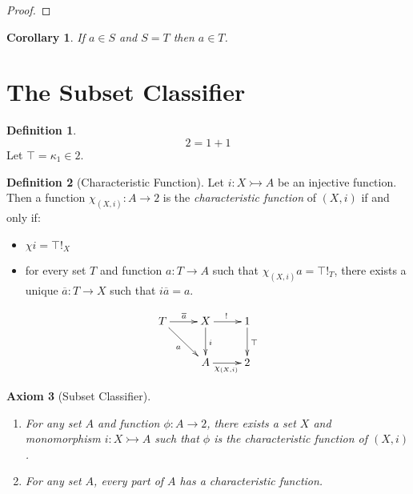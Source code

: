 \documentclass{book}
\let\qed\relax
\newtheorem{ax}{Axiom}[chapter]
\newtheorem{cor}{Corollary}[ax]
\theoremstyle{definition}
\newtheorem{df}[ax]{Definition}
\begin{document}
\begin{proof}
\pf
{}
\qed
\end{proof}

\begin{cor}
If $a \in S$ and $S = T$ then $a \in T$.
\end{cor}


\section{The Subset Classifier}

\begin{df}
\[ 2 = 1 + 1 \]
Let $\top = \kappa_1 \in 2$.
\end{df}

\begin{df}[Characteristic Function]
Let $i : X \rightarrowtail A$ be an injective function. Then a function $\chi_{(X,i)} : A \rightarrow 2$ is the \emph{characteristic function} of $(X,i)$ if and only if:
\begin{itemize}
\item $\chi i = \top !_X$
\item for every set $T$ and function $a : T \rightarrow A$ such that $\chi_{(X,i)} a = \top !_T$, there exists a unique $\overline{a} : T \rightarrow X$ such that $i \overline{a} = a$.
\end{itemize}
\end{df}

\[ \xymatrix{
T \ar[r]^{\overline{a}} \ar[dr]_a & X \ar[d]^i \ar[r]^{!} & 1 \ar[d]^{\top} \\
& A \ar[r]_{\chi_{(X,i)}} & 2
} \]

\begin{ax}[Subset Classifier]$ $
\begin{enumerate}
\item For any set $A$ and function $\phi : A \rightarrow 2$, there exists a set $X$ and monomorphism $i : X \rightarrowtail A$ such that $\phi$ is the characteristic function of $(X,i)$.
\item For any set $A$, every part of $A$ has a characteristic function.
\end{enumerate}
\end{ax}
\end{document}

